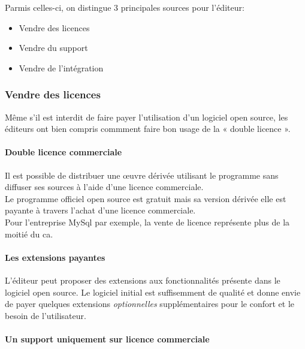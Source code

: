 			Parmis celles-ci, on distingue 3 principales sources pour l'éditeur:

			\begin{itemize}[label=\textbullet, font=\LARGE \color{burntorange}]
				\item Vendre des licences
				\item Vendre du support
				\item Vendre de l'intégration
			\end{itemize}

			\subsubsection{Vendre des licences}

				Même s'il est interdit de faire payer l'utilisation d'un logiciel open source, les éditeurs ont bien compris commment faire bon usage de la « double licence ».

				\paragraph{Double licence commerciale\\}

					Il est possible de distribuer une œuvre dérivée utilisant le programme sans diffuser ses sources à l'aide d'une licence commerciale.\\
					Le programme officiel open source est gratuit mais sa version dérivée elle est payante à travers l'achat d'une licence commerciale.\\
					Pour l'entreprise MySql par exemple, la vente de licence représente plus de la moitié du \acrfull{ca}.

				\paragraph{Les extensions payantes\\}

					L'éditeur peut proposer des extensions aux fonctionnalités présente dans le logiciel open source. Le logiciel initial est suffisemment de qualité et donne envie de payer quelques extensions \textit{optionnelles} supplémentaires pour le confort et le besoin de l'utilisateur.

				\paragraph{Un support uniquement sur licence commerciale\\}

